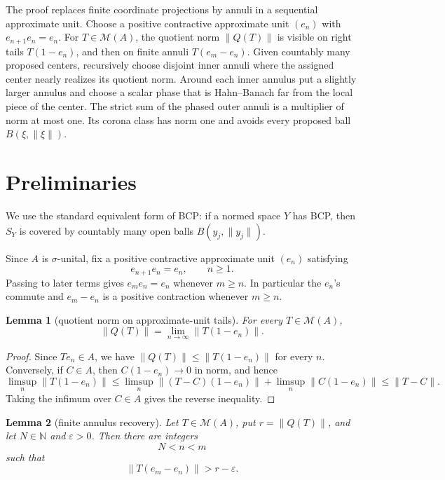 \documentclass[11pt]{article}
\newtheorem{lemma}{Lemma}
\newcommand{\M}{\mathcal M}
\newcommand{\N}{\mathbb N}
\begin{document}
The proof replaces finite coordinate projections by annuli in a sequential
approximate unit.  Choose a positive contractive approximate unit
\((e_n)\) with \(e_{n+1}e_n=e_n\).  For \(T\in\M(A)\), the quotient norm
\(\|Q(T)\|\) is visible on right tails \(T(1-e_n)\), and then on finite
annuli \(T(e_m-e_n)\).  Given countably many proposed centers, recursively
choose disjoint inner annuli where the assigned center nearly realizes its
quotient norm.  Around each inner annulus put a slightly larger annulus and
choose a scalar phase that is Hahn--Banach far from the local piece of the
center.  The strict sum of the phased outer annuli is a multiplier of norm at
most one.  Its corona class has norm one and avoids every proposed ball
\(B(\xi,\|\xi\|)\).

\section*{Preliminaries}

We use the standard equivalent form of BCP: if a normed space \(Y\) has BCP,
then \(S_Y\) is covered by countably many open balls \(B(y_j,\|y_j\|)\).

Since \(A\) is \(\sigma\)-unital, fix a positive contractive approximate unit
\((e_n)\) satisfying
\[
        e_{n+1}e_n=e_n,\qquad n\ge1.
\]
Passing to later terms gives \(e_m e_n=e_n\) whenever \(m\ge n\).  In
particular the \(e_n\)'s commute and \(e_m-e_n\) is a positive contraction
whenever \(m\ge n\).

\begin{lemma}[quotient norm on approximate-unit tails]
\label{lem:tail}
For every \(T\in\M(A)\),
\[
        \|Q(T)\|=\lim_{n\to\infty}\|T(1-e_n)\|.
\]
\end{lemma}

\begin{proof}
Since \(Te_n\in A\), we have \(\|Q(T)\|\le \|T(1-e_n)\|\) for every \(n\).
Conversely, if \(C\in A\), then \(C(1-e_n)\to0\) in norm, and hence
\[
        \limsup_n \|T(1-e_n)\|
        \le
        \limsup_n \|(T-C)(1-e_n)\|+\limsup_n\|C(1-e_n)\|
        \le \|T-C\|.
\]
Taking the infimum over \(C\in A\) gives the reverse inequality.
\end{proof}

\begin{lemma}[finite annulus recovery]
\label{lem:annulus-recovery}
Let \(T\in\M(A)\), put \(r=\|Q(T)\|\), and let \(N\in\N\) and
\(\varepsilon>0\).  Then there are integers
\[
        N<n<m
\]
such that
\[
        \|T(e_m-e_n)\|>r-\varepsilon.
\]
\end{lemma}
\end{document}
